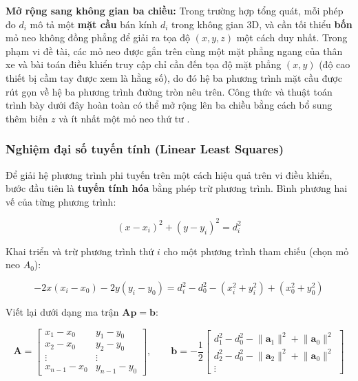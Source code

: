 \textbf{Mở rộng sang không gian ba chiều:} Trong trường hợp tổng quát, mỗi phép đo $d_i$ mô tả một \textbf{mặt cầu} bán kính $d_i$ trong không gian 3D, và cần tối thiểu \textbf{bốn} mỏ neo không đồng phẳng để giải ra tọa độ $(x, y, z)$ một cách duy nhất. Trong phạm vi đề tài, các mỏ neo được gắn trên cùng một mặt phẳng ngang của thân xe và bài toán điều khiển truy cập chỉ cần đến tọa độ mặt phẳng $(x, y)$ (độ cao thiết bị cầm tay được xem là hằng số), do đó hệ ba phương trình mặt cầu được rút gọn về hệ ba phương trình đường tròn nêu trên. Công thức và thuật toán trình bày dưới đây hoàn toàn có thể mở rộng lên ba chiều bằng cách bổ sung thêm biến $z$ và ít nhất một mỏ neo thứ tư \cite{murphy1995trilateration}.

\subsubsection{Nghiệm đại số tuyến tính (Linear Least Squares)}

Để giải hệ phương trình phi tuyến trên một cách hiệu quả trên vi điều khiển, bước đầu tiên là \textbf{tuyến tính hóa} bằng phép trừ phương trình. Bình phương hai vế của từng phương trình:

\begin{equation}
    (x - x_i)^2 + (y - y_i)^2 = d_i^2
\end{equation}

Khai triển và trừ phương trình thứ $i$ cho một phương trình tham chiếu (chọn mỏ neo $A_0$):

\begin{equation}
    -2x(x_i - x_0) - 2y(y_i - y_0) = d_i^2 - d_0^2 - (x_i^2 + y_i^2) + (x_0^2 + y_0^2)
\end{equation}

Viết lại dưới dạng ma trận $\mathbf{A}\mathbf{p} = \mathbf{b}$:

\begin{equation}
    \mathbf{A} =
    \begin{bmatrix}
        x_1 - x_0 & y_1 - y_0 \\
        x_2 - x_0 & y_2 - y_0 \\
        \vdots & \vdots \\
        x_{n-1} - x_0 & y_{n-1} - y_0
    \end{bmatrix}, \qquad
    \mathbf{b} = -\frac{1}{2}
    \begin{bmatrix}
        d_1^2 - d_0^2 - \lVert \mathbf{a}_1 \rVert^2 + \lVert \mathbf{a}_0 \rVert^2 \\
        d_2^2 - d_0^2 - \lVert \mathbf{a}_2 \rVert^2 + \lVert \mathbf{a}_0 \rVert^2 \\
        \vdots
    \end{bmatrix}
\end{equation}

